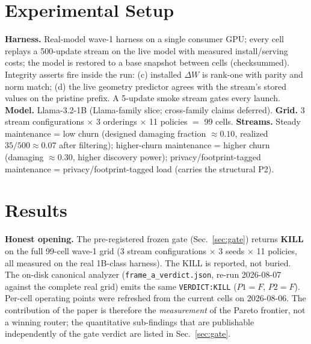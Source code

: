 \documentclass[preprint,12pt]{elsarticle}
\begin{document}
\section{Experimental Setup}
\label{sec:setup}

\textbf{Harness.} Real-model wave-1 harness on a single consumer GPU; every cell
replays a 500-update stream on the live model with measured install/serving costs;
the model is restored to a base snapshot between cells (checksummed). Integrity
asserts fire inside the run: (c) installed $\Delta W$ is rank-one with parity and
norm match; (d) the live geometry predictor agrees with the stream's stored values
on the pristine prefix. A 5-update smoke stream gates every launch.
\textbf{Model.} Llama-3.2-1B (Llama-family slice; cross-family claims deferred).
\textbf{Grid.} 3 stream configurations $\times$ 3 orderings $\times$ 11 policies $=$ 99 cells.
\textbf{Streams.} Steady maintenance = low churn (designed damaging
fraction $\approx 0.10$, realized $35/500 \approx 0.07$ after filtering); higher-churn maintenance =
higher churn (damaging $\approx 0.30$, higher discovery power); privacy/footprint-tagged maintenance =
privacy/footprint-tagged load (carries the structural P2).

\section{Results}
\label{sec:results}

\textbf{Honest opening.} The pre-registered frozen gate (Sec.~\ref{sec:gate})
returns \textbf{KILL} on the full 99-cell wave-1 grid (3 stream configurations $\times$ 3 seeds
$\times$ 11 policies, all measured on the real 1B-class harness). The KILL is reported,
not buried. The on-disk canonical analyzer
(\texttt{frame\_a\_verdict.json}, re-run 2026-08-07 against the complete real grid)
emits the same \texttt{VERDICT:KILL} ($P1{=}F$, $P2{=}F$). Per-cell operating points were
refreshed from the current cells on 2026-08-06. The contribution of the paper is therefore the
\emph{measurement} of the Pareto frontier, not a winning router; the
quantitative sub-findings that are publishable independently of the gate verdict
are listed in Sec.~\ref{sec:gate}.
\end{document}
